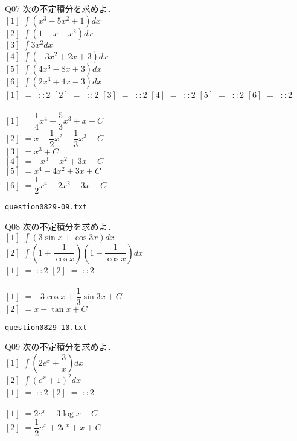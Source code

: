 \documentclass[10pt,dvipdfmx]{jarticle}
\begin{document}
Q07 
$\text{次の不定積分を求めよ．}$\\
$[1]\;\displaystyle\int (x^3-5x^2+1) dx $\\
$[2]\;\displaystyle\int (1-x-x^2) dx $\\
$[3]\;\displaystyle\int 3x^2 dx $\\
$[4]\;\displaystyle\int (-3x^2+2x+3) dx $\\
$[5]\;\displaystyle\int (4x^3-8x+3) dx $\\
$[6]\;\displaystyle\int (2x^3+4x-3) dx $\\
$[1]\;=\;\;::2$ 
$[2]\;=\;\;::2$ 
$[3]\;=\;\;::2$ 
$[4]\;=\;\;::2$ 
$[5]\;=\;\;::2$ 
$[6]\;=\;\;::2$ 
\\
\\
$[1]\;=\dfrac{1}{4}x^4-\dfrac{5}{3}x^3+x+C$\\
$[2]\;=x-\dfrac{1}{2}x^2-\dfrac{1}{3}x^3+C$\\
$[3]\;=x^3+C$\\
$[4]\;=-x^3+x^2+3x+C$\\
$[5]\;=x^4-4x^2+3x+C$\\
$[6]\;=\dfrac{1}{2}x^4+2x^2-3x+C$\\
\newpage
\begin{center}
\verb|question0829-09.txt|\\
\end{center}
Q08 
$\text{次の不定積分を求めよ．}$\\
$[1]\;\displaystyle\int (3\sin x +\cos 3x ) dx $\\
$[2]\;\displaystyle\int (1+\dfrac{1}{\cos x })(1-\dfrac{1}{\cos x }) dx $\\
$[1]\;=\;::2$ 
$[2]\;=\;::2$ 
\\
\\
$[1]\;=-3\cos x +\dfrac{1}{3}\sin 3x +C$\\
$[2]\;=x-\tan x +C$\\
\newpage
\begin{center}
\verb|question0829-10.txt|\\
\end{center}
Q09 
$\text{次の不定積分を求めよ．}$\\
$[1]\;\displaystyle\int (2e^x+\dfrac{3}{x}) dx $\\
$[2]\;\displaystyle\int (e^x+1)^2 dx $\\
$[1]\;=\;::2$ 
$[2]\;=\;::2$ 
\\
\\
$[1]\;=2e^x+3\log x +C$\\
$[2]\;=\dfrac{1}{2}e^x+2e^x+x+C$\\
\newpage
\end{document}
